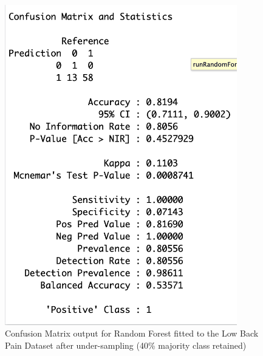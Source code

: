 \begin{figure}[!htbp]
    \centering
    \begin{minipage}{0.45\textwidth}
        \centering
        \includegraphics[width=0.9\textwidth]{ThesisTemplate/appendix/images/Chapter5Appendix/ConfusionMatrix40/LBP.png}
        \caption{Confusion Matrix output for Random Forest fitted to the Low Back Pain Dataset after under-sampling (40\% majority class retained)}
        \label{fig:my_label}
    \end{minipage}\hfill
    \begin{minipage}{0.45\textwidth}
        \centering

\end{minipage}
\end{figure}
